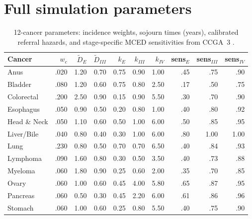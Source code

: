 \documentclass[11pt,letter]{article}
\begin{document}
\appendix
\section{Full simulation parameters}
\label{app:params}

\begin{table}[!ht]\centering\small
\caption{12-cancer parameters: incidence weights, sojourn times (years),
calibrated referral hazards, and stage-specific MCED sensitivities from
CCGA~3 \cite{Klein2021, GRAILfaq}.}
\label{tab:cancers}
\begin{tabular}{lrrrrrrrrr}\toprule
Cancer & $w_c$ & $\tilde{D}_E$ & $\tilde{D}_{III}$ &
  $k_E$ & $k_{III}$ & $k_{IV}$ &
  sens$_E$ & sens$_{III}$ & sens$_{IV}$ \\ \midrule
Anus        & .020 & 1.20 & 0.70 & 0.75 & 0.90 & 1.00 & .45 & .75 & .90 \\
Bladder     & .080 & 1.20 & 0.60 & 0.75 & 0.80 & 2.50 & .17 & .50 & .75 \\
Colorectal  & .200 & 2.50 & 0.90 & 0.15 & 0.90 & 5.50 & .30 & .70 & .90 \\
Esophagus   & .050 & 0.90 & 0.50 & 0.20 & 0.80 & 1.00 & .40 & .80 & .92 \\
Head \& Neck& .050 & 1.10 & 0.60 & 0.50 & 1.00 & 6.00 & .50 & .85 & .95 \\
Liver/Bile  & .040 & 0.80 & 0.40 & 0.30 & 1.00 & 6.00 & .80 & 1.00 & 1.00 \\
Lung        & .230 & 0.80 & 0.50 & 0.70 & 0.70 & 6.50 & .40 & .84 & .93 \\
Lymphoma    & .090 & 1.60 & 0.80 & 0.30 & 0.50 & 3.50 & .40 & .73 & .88 \\
Myeloma     & .060 & 1.80 & 0.90 & 0.25 & 0.60 & 2.00 & .35 & .70 & .85 \\
Ovary       & .060 & 1.00 & 0.60 & 0.45 & 4.00 & 5.80 & .65 & .87 & .95 \\
Pancreas    & .060 & 0.50 & 0.30 & 0.45 & 2.20 & 6.00 & .61 & .86 & .96 \\
Stomach     & .060 & 1.00 & 0.60 & 0.25 & 0.80 & 5.50 & .40 & .75 & .90 \\
\bottomrule
\end{tabular}
\end{table}
\end{document}
